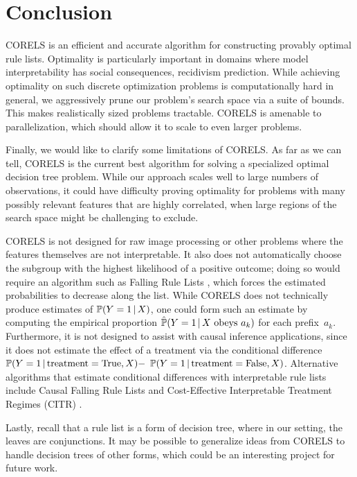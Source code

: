 \section{Conclusion}

CORELS is an efficient and accurate algorithm for constructing provably optimal rule lists.
%
Optimality is particularly important in domains where model interpretability
has social consequences, \eg recidivism prediction.
%
While achieving optimality on such discrete optimization problems is
computationally hard in general, we aggressively prune our problem's search space
via a suite of bounds.
%
This makes realistically sized problems tractable.
%
CORELS is amenable to parallelization, which should allow it to scale to
even larger problems.

\begin{arxiv}
Finally, we would like to clarify some limitations of CORELS.
%
As far as we can tell, CORELS is the current best algorithm for solving a
specialized optimal decision tree problem.
%
While our approach scales well to large numbers of observations,
it could have difficulty proving optimality
for problems with many possibly relevant features that are highly correlated,
when large regions of the search space might be challenging to exclude.

CORELS is not designed for raw image processing or other problems where the features
themselves are not interpretable.
%
It also does not automatically choose the subgroup with the highest likelihood of a
positive outcome; doing so would require an algorithm such as Falling Rule Lists \citep{WangRu15},
which forces the estimated probabilities to decrease along the list.
%
While CORELS does not technically produce estimates of ${\mathbb{P}(Y=1 \,|\, X)}$,
one could form such an estimate by computing the empirical
proportion ${\hat{\mathbb{P}}(Y=1 \,|\, X \textrm{ obeys } a_k)}$ for each prefix~$a_k$.
%
Furthermore, it is not designed to assist with causal inference applications, since
it does not estimate the effect of a treatment via the conditional difference
${\mathbb{P}(Y=1 \,|\, \textrm{treatment} = \textrm{True}, X) -}$ ${\mathbb{P}(Y=1 \,|\, \textrm{treatment} = \textrm{False}, X)}$.
%
Alternative algorithms that estimate conditional differences with interpretable
rule lists include Causal Falling Rule Lists \citep{WangRu16}
and Cost-Effective Interpretable Treatment Regimes (CITR) \citep{LakkarajuRu17}.

Lastly, recall that a rule list is a form of decision tree,
where in our setting, the leaves are conjunctions.
%
It may be possible to generalize ideas from CORELS to handle decision trees of
other forms, which could be an interesting project for future work.
\end{arxiv}
